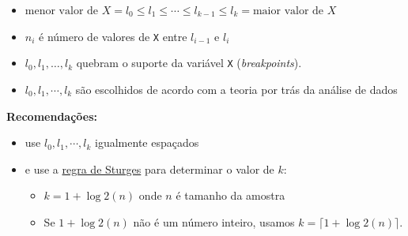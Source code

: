 \documentclass[
  10pt,
  ignorenonframetext,
]{beamer}
\providecommand{\tightlist}{%
  \setlength{\itemsep}{0pt}\setlength{\parskip}{0pt}}\usepackage{longtable,booktabs,array}
\begin{document}
\begin{frame}[fragile]
\begin{itemize}
\tightlist
\item
  \(\text{menor valor de }X = l_0 \leq l_1 \leq \cdots \leq l_{k-1} \leq l_k = \text{maior valor de }X\)
\item
  \(n_i\) é número de valores de \texttt{X} entre \(l_{i-1}\) e \(l_i\)
\item
  \(l_0, l_1, \dots, l_k\) quebram o suporte da variável \texttt{X}
  (\emph{breakpoints}).
\item
  \(l_0, l_1, \cdots, l_k\) são escolhidos de acordo com a teoria por
  trás da análise de dados
\end{itemize}

\textbf{Recomendações:}

\begin{itemize}
\tightlist
\item
  use \(l_0, l_1, \cdots, l_k\) igualmente espaçados
\item
  e use a
  \href{https://onlinelibrary.wiley.com/doi/10.1002/wics.35}{regra de
  Sturges} para determinar o valor de \(k\):

  \begin{itemize}
  \tightlist
  \item
    \(k = 1 + \log2(n)\) onde \(n\) é tamanho da amostra
  \item
    Se \(1 + \log2(n)\) não é um número inteiro, usamos
    \(k = \lceil 1 + \log2(n) \rceil\).
  \end{itemize}
\end{itemize}
\end{frame}
\end{document}
